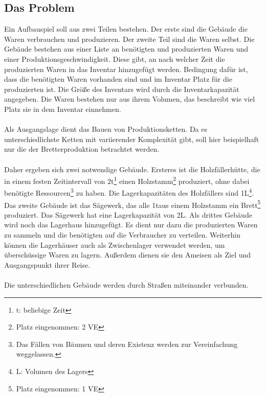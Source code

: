 \documentclass[12pt]{article}
\begin{document}
\subsection{Das Problem}
Ein Aufbauspiel soll aus zwei Teilen bestehen. Der erste sind die Gebäude die Waren verbrauchen und produzieren. Der zweite Teil sind die Waren selbst. Die Gebäude bestehen aus einer Liste an benötigten und produzierten Waren und einer Produktionsgeschwindigkeit. Diese gibt, an nach welcher Zeit die produzierten Waren in das Inventar hinzugefügt werden. Bedingung dafür ist, dass die benötigten Waren vorhanden sind und im Inventar Platz für die produzierten ist. Die Größe des Inventars wird durch die Inventarkapazität angegeben.
Die Waren bestehen nur aus ihrem Volumen, das beschreibt wie viel Platz sie in dem Inventar einnehmen.\\\\
Als Ausgangslage dient das Bauen von Produktionsketten. Da es unterschiedlichste Ketten mit variierender Komplexität gibt, soll hier beispielhaft nur die der Bretterproduktion betrachtet werden.\\\\
Daher ergeben sich zwei notwendige Gebäude. Ersteres ist die Holzfällerhütte, die in einem festen Zeitintervall von 2t\footnote{t: beliebige Zeit} einen Holzstamm\footnote{Platz eingenommen: 2 VE} produziert, ohne dabei benötigte Ressourcen\footnote{Das Fällen von Bäumen und deren Existenz werden zur Vereinfachung weggelassen.} zu haben. Die Lagerkapazitäten des Holzfällers sind 1L\footnote{L: Volumen des Lagers}. Das zweite Gebäude ist das Sägewerk, das alle 1t\footnotemark[3] aus einem Holzstamm ein Brett\footnote{Platz eingenommen: 1 VE} produziert. Das Sägewerk hat eine Lagerkapazität von 2L\footnotemark[6]. 
Als drittes Gebäude wird noch das Lagerhaus hinzugefügt. Es dient nur dazu die produzierten Waren zu sammeln und die benötigten auf die Verbraucher zu verteilen. Weiterhin können die Lagerhäuser auch als Zwischenlager verwendet werden, um überschüssige Waren zu lagern. Außerdem dienen sie den Ameisen als Ziel und Ausgangspunkt ihrer Reise.\\\\
Die unterschiedlichen Gebäude werden durch Straßen miteinander verbunden.
\end{document}
